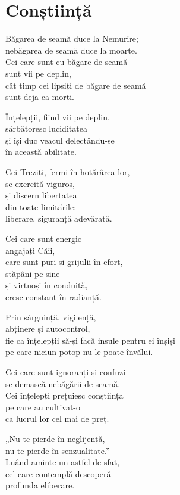 
\chapter{Conștiință}

Băgarea de seamă duce la Nemurire;\\
nebăgarea de seamă duce la moarte.\\
Cei care sunt cu băgare de seamă\\
sunt vii pe deplin,\\
cât timp cei lipsiți de băgare de seamă\\
sunt deja ca morți.

Înțelepții, fiind vii pe deplin,\\
sărbătoresc luciditatea\\
și își duc veacul delectându-se\\
în această abilitate.


Cei Treziți, fermi în hotărârea lor,\\
se exercită viguros,\\
și discern libertatea\\
din toate limitările:\\
liberare, siguranță adevărată.


Cei care sunt energic\\
angajați Căii,\\
care sunt puri și grijulii în efort,\\
stăpâni pe sine\\
și virtuoși în conduită,\\
cresc constant în radianță.


Prin sârguință, vigilență,\\
abținere și autocontrol,\\
fie ca înțelepții să-și facă insule pentru ei înșiși\\
pe care niciun potop nu le poate învălui.



Cei care sunt ignoranți și confuzi\\
se demască nebăgării de seamă.\\
Cei înțelepți prețuiesc conștiința\\
pe care au cultivat-o\\
ca lucrul lor cel mai de preț.


„Nu te pierde în neglijență,\\
nu te pierde în senzualitate.”\\
Luând aminte un astfel de sfat,\\
cel care contemplă descoperă\\
profunda eliberare.

